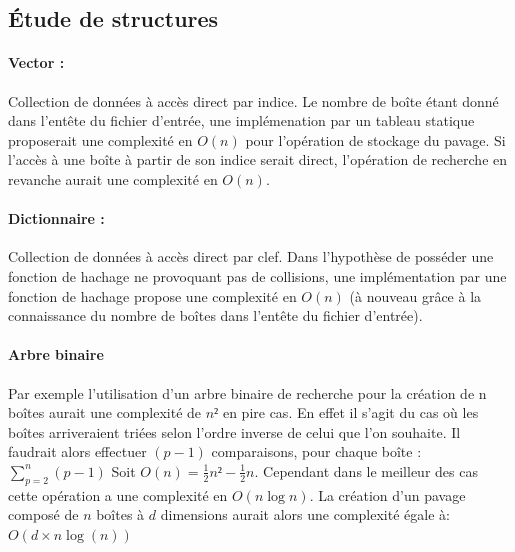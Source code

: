 \subsection{\'Etude de structures}

\paragraph{Vector :} Collection de données à accès direct par indice. Le nombre de boîte étant donné dans l'entête du fichier d'entrée, une implémenation par un tableau statique proposerait une complexité en $O(n)$ pour l'opération de stockage du pavage. Si l'accès à une boîte à partir de son indice serait direct, l'opération de recherche en revanche aurait une complexité en $O(n)$. 

\paragraph{Dictionnaire :} Collection de données à accès direct par clef. Dans l'hypothèse de posséder une fonction de hachage ne provoquant pas de collisions, une implémentation par une fonction de hachage propose une complexité en $O(n)$ (à nouveau grâce à la connaissance du nombre de boîtes dans l'entête du fichier d'entrée).




\paragraph{Arbre binaire}
Par exemple l'utilisation d'un arbre binaire de recherche pour la création de n boîtes aurait une complexité de $n²$ en pire cas. En effet il s'agit du cas où les boîtes arriveraient triées selon l'ordre inverse de celui que l'on souhaite. Il faudrait alors effectuer $(p-1)$ comparaisons, pour chaque boîte :  $\sum_{p=2}^{n}(p-1)$  Soit $O(n)=\frac{1}{2}n²-\frac{1}{2}n$. Cependant dans le meilleur des cas cette opération a une complexité en $O(n\log{n})$. La création d'un pavage composé de $n$ boîtes à $d$ dimensions aurait alors une complexité égale à: $O(d \times n\log(n))$ 

